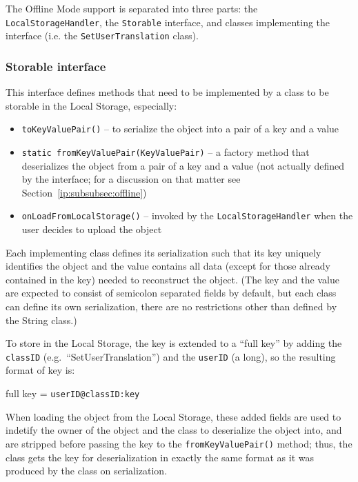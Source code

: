 The Offline Mode support is separated into three parts: the {\tt LocalStorageHandler}, the {\tt Storable} interface, and classes implementing the interface (i.e. the {\tt SetUserTranslation} class).

\subsubsection{Storable interface}
\label{gui:subsubsec:storable}

This interface defines methods that need to be implemented by a class to be storable in the Local Storage, especially:

\begin{itemize}
\item {\tt toKeyValuePair()} -- to serialize the object into a pair of a key and a value

\item {\tt static fromKeyValuePair(KeyValuePair)} -- a factory method that deserializes the object from a pair of a key and a value (not actually defined by the interface; for a discussion on that matter see Section~\ref{ip:subsubsec:offline})

\item {\tt onLoadFromLocalStorage()} -- invoked by the {\tt LocalStorageHandler} when the user decides to upload the object
\end{itemize}

Each implementing class defines its serialization such that its key uniquely identifies the object and the value contains all data (except for those already contained in the key) needed to reconstruct the object.
(The key and the value are expected to consist of semicolon separated fields by default, but each class can define its own serialization, there are no restrictions other than defined by the String class.)

To store in the Local Storage, the key is extended to a ``full key'' by adding the {\tt classID} (e.g.\ ``SetUserTranslation'') and the {\tt userID} (a long),
so the resulting format of key is:

\begin{center}
full key = {\tt userID@classID:key}
\end{center}
When loading the object from the Local Storage, these added fields are used to indetify the owner of the object and the class to deserialize the object into, and are stripped before passing the key to the {\tt fromKeyValuePair()} method; thus, the class gets the key for deserialization in exactly the same format as it was produced by the class on serialization.

